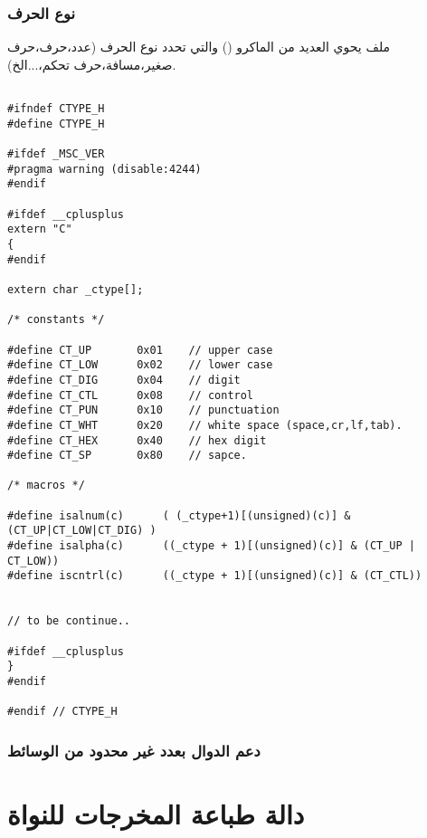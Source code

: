 \documentclass[document.tex]{subfiles}
\begin{document}
\subsubsection{نوع الحرف}
ملف  يحوي العديد من الماكرو () والتي تحدد نوع الحرف (عدد،حرف،حرف صغير،مسافة،حرف تحكم،...الخ).

\begin{english}

\lstset{numberstyle=\tiny,numbersep=5pt,tabsize=2,extendedchars=true,breaklines=true,frame=b,showspaces=false, showtabs=false,xleftmargin=10pt,framexleftmargin=10pt,framexrightmargin=5pt,framexbottommargin=4pt,showstringspaces=false,language=C++}

\begin{lstlisting}[label=char_type,caption=ctype.h:determine character type]

#ifndef CTYPE_H
#define CTYPE_H

#ifdef _MSC_VER
#pragma warning (disable:4244)
#endif

#ifdef __cplusplus
extern "C"
{
#endif

extern char _ctype[];

/* constants */

#define	CT_UP 		0x01	// upper case
#define CT_LOW		0x02	// lower case
#define CT_DIG		0x04	// digit
#define CT_CTL		0x08	// control
#define CT_PUN		0x10	// punctuation
#define CT_WHT		0x20	// white space (space,cr,lf,tab).
#define CT_HEX		0x40	// hex digit
#define CT_SP		0x80	// sapce.

/* macros */

#define isalnum(c)		( (_ctype+1)[(unsigned)(c)] & (CT_UP|CT_LOW|CT_DIG) )
#define isalpha(c)		((_ctype + 1)[(unsigned)(c)] & (CT_UP | CT_LOW))
#define iscntrl(c)	    ((_ctype + 1)[(unsigned)(c)] & (CT_CTL))


// to be continue..

#ifdef __cplusplus
}
#endif

#endif // CTYPE_H

\end{lstlisting}
\end{english}

\subsubsection{دعم الدوال بعدد غير محدود من الوسائط}

\section{دالة طباعة المخرجات للنواة}
\end{document}
